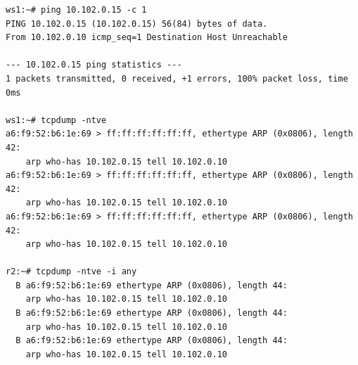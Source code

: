 \documentclass[a4paper,12pt]{article}
\begin{document}
\begin{Verbatim}
ws1:~# ping 10.102.0.15 -c 1
PING 10.102.0.15 (10.102.0.15) 56(84) bytes of data.
From 10.102.0.10 icmp_seq=1 Destination Host Unreachable

--- 10.102.0.15 ping statistics ---
1 packets transmitted, 0 received, +1 errors, 100% packet loss, time 0ms

ws1:~# tcpdump -ntve
a6:f9:52:b6:1e:69 > ff:ff:ff:ff:ff:ff, ethertype ARP (0x0806), length 42:
    arp who-has 10.102.0.15 tell 10.102.0.10
a6:f9:52:b6:1e:69 > ff:ff:ff:ff:ff:ff, ethertype ARP (0x0806), length 42:
    arp who-has 10.102.0.15 tell 10.102.0.10
a6:f9:52:b6:1e:69 > ff:ff:ff:ff:ff:ff, ethertype ARP (0x0806), length 42:
    arp who-has 10.102.0.15 tell 10.102.0.10

r2:~# tcpdump -ntve -i any
  B a6:f9:52:b6:1e:69 ethertype ARP (0x0806), length 44:
    arp who-has 10.102.0.15 tell 10.102.0.10
  B a6:f9:52:b6:1e:69 ethertype ARP (0x0806), length 44:
    arp who-has 10.102.0.15 tell 10.102.0.10
  B a6:f9:52:b6:1e:69 ethertype ARP (0x0806), length 44:
    arp who-has 10.102.0.15 tell 10.102.0.10
\end{Verbatim}
\end{document}
